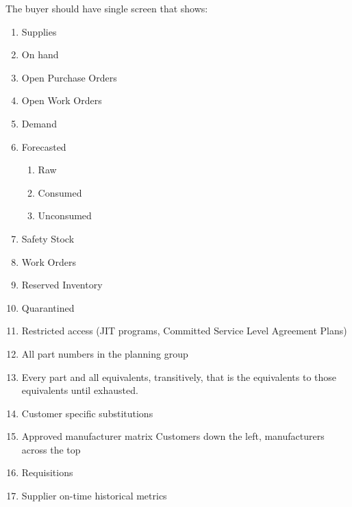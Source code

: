 \documentclass[letterpaper,10pt,english]{sphinxmanual}
\begin{document}
The buyer should have single screen that shows:
\begin{enumerate}
%
\item {} 
Supplies

\item {} 
On hand

\item {} 
Open Purchase Orders

\item {} 
Open Work Orders

\item {} 
Demand

\item {} 
Forecasted
\begin{enumerate}
%
\item {} 
Raw

\item {} 
Consumed

\item {} 
Unconsumed

\end{enumerate}

\item {} 
Safety Stock

\item {} 
Work Orders

\item {} 
Reserved Inventory

\item {} 
Quarantined

\item {} 
Restricted access (JIT programs, Committed Service Level Agreement
Plans)

\item {} 
All part numbers in the planning group

\item {} 
Every part and all equivalents, transitively, that is the equivalents
to those equivalents until exhausted.

\item {} 
Customer specific substitutions

\item {} 
Approved manufacturer matrix Customers down the left, manufacturers
across the top

\item {} 
Requisitions

\item {} 
Supplier on-time historical metrics


\end{enumerate}
\end{document}
